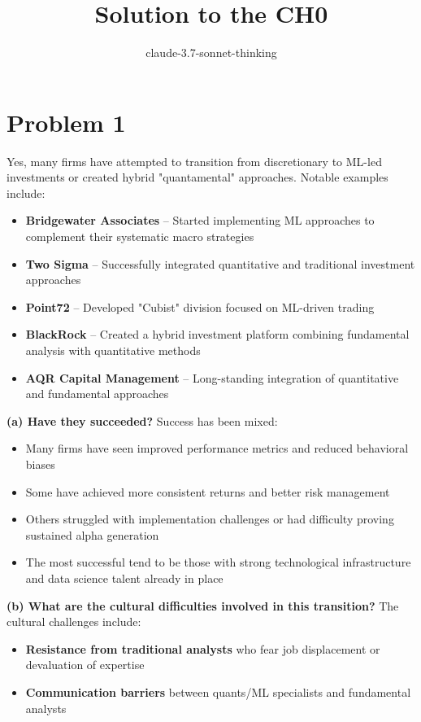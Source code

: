 \documentclass{article}
\begin{document}
\begin{sloppypar}
\title{Solution to the CH0}
\author{claude-3.7-sonnet-thinking}
\maketitle
\section{Problem 1}

Yes, many firms have attempted to transition from discretionary to ML-led investments or created hybrid "quantamental" approaches. Notable examples include:
\begin{itemize}
\item \textbf{Bridgewater Associates} -- Started implementing ML approaches to complement their systematic macro strategies
\item \textbf{Two Sigma} -- Successfully integrated quantitative and traditional investment approaches
\item \textbf{Point72} -- Developed "Cubist" division focused on ML-driven trading
\item \textbf{BlackRock} -- Created a hybrid investment platform combining fundamental analysis with quantitative methods
\item \textbf{AQR Capital Management} -- Long-standing integration of quantitative and fundamental approaches
\end{itemize}
\textbf{(a) Have they succeeded?}
Success has been mixed:
\begin{itemize}
\item Many firms have seen improved performance metrics and reduced behavioral biases
\item Some have achieved more consistent returns and better risk management
\item Others struggled with implementation challenges or had difficulty proving sustained alpha generation
\item The most successful tend to be those with strong technological infrastructure and data science talent already in place
\end{itemize}
\textbf{(b) What are the cultural difficulties involved in this transition?}
The cultural challenges include:
\begin{itemize}
\item \textbf{Resistance from traditional analysts} who fear job displacement or devaluation of expertise
\item \textbf{Communication barriers} between quants/ML specialists and fundamental analysts

\end{itemize}
\end{sloppypar}
\end{document}
